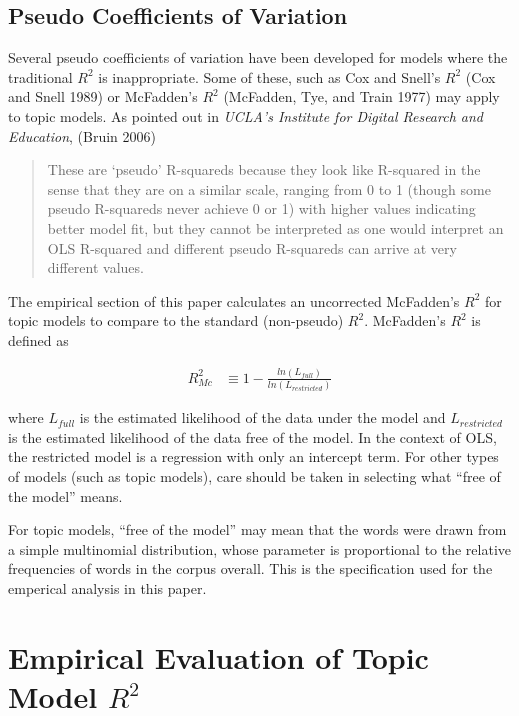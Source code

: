 \documentclass[conference,final,]{IEEEtran}
\begin{document}
\hypertarget{pseudo-coefficients-of-variation}{%
\subsection{Pseudo Coefficients of
Variation}\label{pseudo-coefficients-of-variation}}

Several pseudo coefficients of variation have been developed for models
where the traditional \(R^2\) is inappropriate. Some of these, such as
Cox and Snell's \(R^2\) (Cox and Snell 1989) or McFadden's \(R^2\)
(McFadden, Tye, and Train 1977) may apply to topic models. As pointed
out in \emph{UCLA's Institute for Digital Research and Education},
(Bruin 2006)

\begin{quote}
These are `pseudo' R-squareds because they look like R-squared in the sense that they are on a similar scale, ranging from 0 to 1 (though some pseudo R-squareds never achieve 0 or 1) with higher values indicating better model fit, but they cannot be interpreted as one would interpret an OLS R-squared and different pseudo R-squareds can arrive at very different values. 
\end{quote}

The empirical section of this paper calculates an uncorrected McFadden's
\(R^2\) for topic models to compare to the standard (non-pseudo)
\(R^2\). McFadden's \(R^2\) is defined as

\begin{align}
    R^2_{Mc} & \equiv 1 - \frac{ ln( L_{full} ) }{ ln( L_{restricted} ) }
\end{align}

where \(L_{full}\) is the estimated likelihood of the data under the
model and \(L_{restricted}\) is the estimated likelihood of the data
free of the model. In the context of OLS, the restricted model is a
regression with only an intercept term. For other types of models (such
as topic models), care should be taken in selecting what ``free of the
model'' means.

For topic models, ``free of the model'' may mean that the words were
drawn from a simple multinomial distribution, whose parameter is
proportional to the relative frequencies of words in the corpus overall.
This is the specification used for the emperical analysis in this paper.

\hypertarget{empirical-evaluation-of-topic-model-r2}{%
\section{\texorpdfstring{Empirical Evaluation of Topic Model
\(R^2\)}{Empirical Evaluation of Topic Model R\^{}2}}\label{empirical-evaluation-of-topic-model-r2}}
\end{document}
